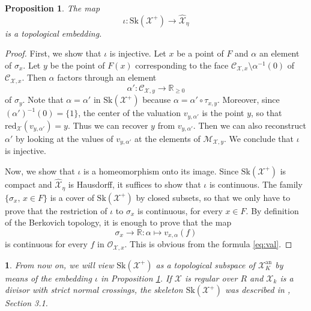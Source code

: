 \documentclass{amsart}%
\numberwithin{equation}{subsection}
\theoremstyle{plain2}
\newtheorem{prop}[equation]{Proposition}
\theoremstyle{definition2}
\theoremstyle{stepstyle}
\theoremstyle{point}
\theoremstyle{subpoint}
\newtheorem{subpoint}[equation]{}%
\newcommand{\spa}[1]{\begin{subpoint}#1\end{subpoint}}           %
\newcommand{\R}{\ensuremath{\mathbb{R}}}
\newcommand{\cX}{\ensuremath{\mathscr{X}}}
\renewcommand{\R}{\ensuremath{\mathbb{R}}}
\newcommand{\redu}{\mathrm{red}}
\newcommand{\an}{\mathrm{an}}
\newcommand{\Sk}{\mathrm{Sk}}
\begin{document}
\begin{prop}\label{prop-embed}
The map
$$\iota:\Sk(\cX^+)\to \widehat{\cX}_\eta$$  is a
topological embedding.
\end{prop}
\begin{proof}
First, we show that $\iota$ is injective. Let $x$ be a point of
$F$ and $\alpha$ an element of $\sigma_x$. Let $y$ be the point of
$F(x)$ corresponding to the face $\mathcal{C}_{\cX,x}\setminus
\alpha^{-1}(0)$ of $\mathcal{C}_{\cX,x}$. Then $\alpha$ factors
through an element
$$\alpha':\mathcal{C}_{\cX,y}\to \R_{\geq 0}$$ of $\sigma_y$.  Note that $\alpha=\alpha'$ in $\Sk(\cX^+)$ because
 $\alpha=\alpha'\circ \tau_{x,y}$.
 Moreover, since
$(\alpha')^{-1}(0)=\{1\}$, the center of the valuation
$v_{y,\alpha'}$ is the point $y$, so that
$\redu_{\cX}(v_{y,\alpha'})=y$. Thus we can recover $y$ from
$v_{y,\alpha'}$. Then we can also reconstruct $\alpha'$ by
 looking at the values of $v_{y,\alpha'}$ at the elements of
 $\mathcal{M}_{\cX,y}$. We conclude that $\iota$ is injective.

 Now, we show that $\iota$ is a homeomorphism onto its image. Since $\Sk(\cX^+)$ is compact and $\widehat{\cX}_\eta$ is Hausdorff,
it suffices to show that $\iota$ is continuous. The family
$\{\sigma_x,\,x\in F\}$ is a cover of $\Sk(\cX^+)$ by closed
subsets, so that we only have to prove that the restriction of
$\iota$ to $\sigma_x$ is continuous, for every $x\in F$. By
definition of the Berkovich topology, it is enough to prove that
the map
$$\sigma_x\to \R:\alpha\mapsto v_{x,\alpha}(f)$$ is continuous for
every $f$ in $\mathcal{O}_{\cX,x}$. This is obvious from the
formula \eqref{eq:val}.
\end{proof}

\spa{ From now on, we will view $\Sk(\cX^+)$ as a topological subspace of $\cX_K^{\an}$ by means of the embedding $\iota$ in Proposition \ref{prop-embed}. If $\cX$ is regular over $R$ and $\cX_k$ is a divisor with strict normal crossings, the skeleton $\Sk(\cX^+)$ was
described in \cite{MustataNicaise}, Section 3.1.}
\end{document}
